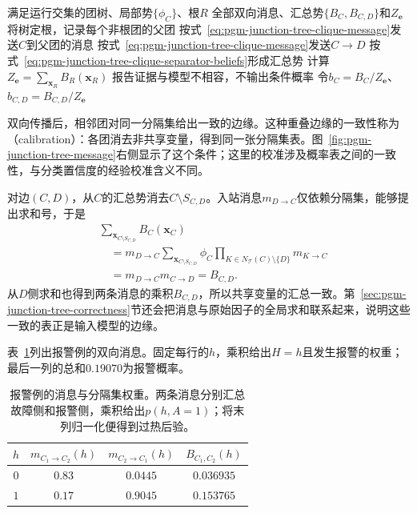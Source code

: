\begin{algorithm}[团树上的和积校准]
  \label{alg:pgm-junction-tree-calibrate}
  \begin{algorithmic}[1]
    \Require 满足运行交集的团树、局部势$\{\phi_C\}$、根$R$
    \Ensure 全部双向消息、汇总势$\{B_C,B_{C,D}\}$和$Z_{\bm{e}}$
    \State 将树定根，记录每个非根团的父团
      \State 按式~\eqref{eq:pgm-junction-tree-clique-message}发送$C$到父团的消息
    \EndFor
        \State 按式~\eqref{eq:pgm-junction-tree-clique-message}发送$C\to D$
      \EndFor
    \EndFor
    \State 按式~\eqref{eq:pgm-junction-tree-clique-separator-beliefs}形成汇总势
    \State 计算$Z_{\bm{e}}=\sum_{\bm{x}_R}B_R(\bm{x}_R)$
      \State 报告证据与模型不相容，不输出条件概率
    \Else
      \State 令$b_C=B_C/Z_{\bm{e}}$、$b_{C,D}=B_{C,D}/Z_{\bm{e}}$
    \EndIf
  \end{algorithmic}
\end{algorithm}

双向传播后，相邻团对同一分隔集给出一致的边缘。这种重叠边缘的一致性称为（calibration）：各团消去非共享变量，得到同一张分隔集表。图~\ref{fig:pgm-junction-tree-message}右侧显示了这个条件；这里的校准涉及概率表之间的一致性，与分类置信度的经验校准含义不同。

对边$(C,D)$，从$C$的汇总势消去$C\setminus S_{C,D}$。入站消息$m_{D\to C}$仅依赖分隔集，能够提出求和号，于是
\begin{equation}
  \begin{aligned}
    &\sum_{\bm{x}_{C\setminus S_{C,D}}}B_C(\bm{x}_C)\\
      &\quad=m_{D\to C}
        \sum_{\bm{x}_{C\setminus S_{C,D}}}
          \phi_C\prod_{K\in N_{\mathcal{T}}(C)\setminus\{D\}}m_{K\to C}\\
      &\quad=m_{D\to C}m_{C\to D}=B_{C,D}.
  \end{aligned}
  \label{eq:pgm-junction-tree-local-calibration}
\end{equation}
从$D$侧求和也得到两条消息的乘积$B_{C,D}$，所以共享变量的汇总一致。第~\ref{sec:pgm-junction-tree-correctness}节还会把消息与原始因子的全局求和联系起来，说明这些一致的表正是输入模型的边缘。

表~\ref{tab:pgm-junction-tree-calibrated-separator}列出报警例的双向消息。固定每行的$h$，乘积给出$H=h$且发生报警的权重；最后一列的总和$0.19070$为报警概率。

\begin{table}[htbp]
  \centering
  \begin{tabular}{cccc}
    \toprule
    $h$ & $m_{C_1\to C_2}(h)$ & $m_{C_2\to C_1}(h)$ & $B_{C_1,C_2}(h)$\\
    \midrule
    $0$ & $0.83$ & $0.0445$ & $0.036935$\\
    $1$ & $0.17$ & $0.9045$ & $0.153765$\\
    \bottomrule
  \end{tabular}
  \caption{报警例的消息与分隔集权重。两条消息分别汇总故障侧和报警侧，乘积给出$p(h,A=1)$；将末列归一化便得到过热后验。}
  \label{tab:pgm-junction-tree-calibrated-separator}
\end{table}

